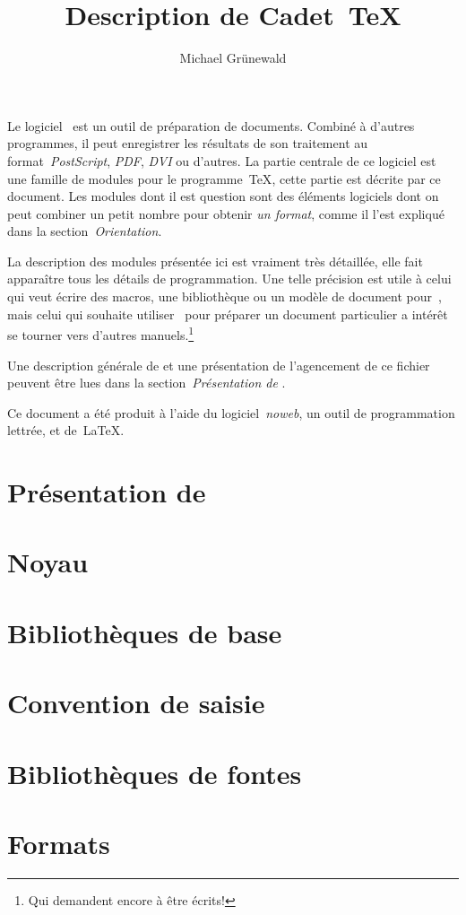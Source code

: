 \documentclass{article}
\title{Description de Cadet~\TeX}
\author{Michael Grünewald}
\begin{document}
\maketitle
Le logiciel~{\brTeX} est un outil de préparation de documents. Combiné
à d'autres programmes, il peut enregistrer les résultats de son
traitement au format~\emph{PostScript}, \emph{PDF}, \emph{DVI} ou
d'autres. La partie centrale de ce logiciel est une famille de modules
pour le programme~{\TeX}, cette partie est décrite par ce document. Les
modules dont il est question sont des éléments logiciels dont on peut
combiner un petit nombre pour obtenir \emph{un format}, comme il
l'est expliqué dans la section~\emph{Orientation}.

La description des modules présentée ici est vraiment très détaillée,
elle fait apparaître tous les détails de programmation. Une telle
précision est utile à celui qui veut écrire des macros, une
bibliothèque ou un modèle de document pour~{\brTeX}, mais celui qui
souhaite utiliser~{\brTeX} pour préparer un document particulier
a intérêt se tourner vers d'autres manuels.\footnote{Qui demandent
encore à être écrits!}

Une description générale de {\brTeX} et une présentation de
l'agencement de ce fichier peuvent être lues dans la
section~\emph{Présentation de {\brTeX}}.

Ce document a été produit à l'aide du logiciel~\emph{noweb}, un outil
de programmation lettrée, et de~{\LaTeX}.

\tableofcontents
\part{Présentation de \brTeX}

\part{Noyau}


\part{Bibliothèques de base}






\part{Convention de saisie}





\part{Bibliothèques de fontes}







\part{Formats}





\end{document}
